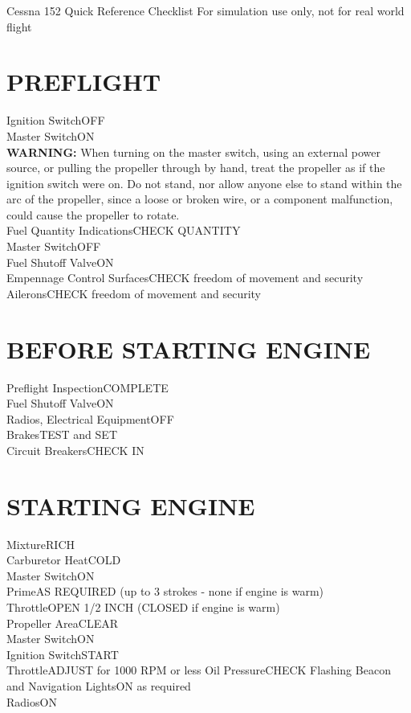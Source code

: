 \documentclass{article}
\begin{document}
\centering
{\fontsize{25}{70}\selectfont Cessna 152}
\break
{\fontsize{20.74}{70}\selectfont Quick Reference Checklist}
\break
\color{Red}
{\fontsize{10}{70}\selectfont For simulation use only, not for real world flight}

\color{Black}
\begin{multicols*}{2}
\section*{PREFLIGHT}
Ignition Switch\dotfill OFF\\
Master Switch\dotfill ON\\
\centering \textbf{WARNING:}
When turning on the master switch, using an external power source, or pulling the propeller through by hand, treat the propeller as if the ignition switch were on. Do not stand, nor allow anyone else to stand within the arc of the propeller, since a loose or broken wire, or a component malfunction, could cause the propeller to rotate.\\
Fuel Quantity Indications\dotfill CHECK QUANTITY\\
Master Switch\dotfill OFF\\
Fuel Shutoff Valve\dotfill ON\\
Empennage Control Surfaces\dotfill CHECK freedom of movement and security\\
Ailerons\dotfill CHECK freedom of movement and security\\
\section*{BEFORE STARTING ENGINE}
Preflight Inspection\dotfill COMPLETE\\
Fuel Shutoff Valve\dotfill ON\\
Radios, Electrical Equipment\dotfill OFF\\
Brakes\dotfill TEST and SET\\
Circuit Breakers\dotfill CHECK IN\\
\section*{STARTING ENGINE}
Mixture\dotfill RICH\\
Carburetor Heat\dotfill COLD\\
Master Switch\dotfill ON\\
Prime\dotfill AS REQUIRED (up to 3 strokes - none if engine is warm)\\
Throttle\dotfill OPEN 1/2 INCH (CLOSED if engine is warm)\\
Propeller Area\dotfill CLEAR\\
Master Switch\dotfill ON\\
Ignition Switch\dotfill START\\
Throttle\dotfill ADJUST for 1000 RPM or less
Oil Pressure\dotfill CHECK
Flashing Beacon and Navigation Lights\dotfill ON as required\\
Radios\dotfill ON

\end{multicols*}
\end{document}
